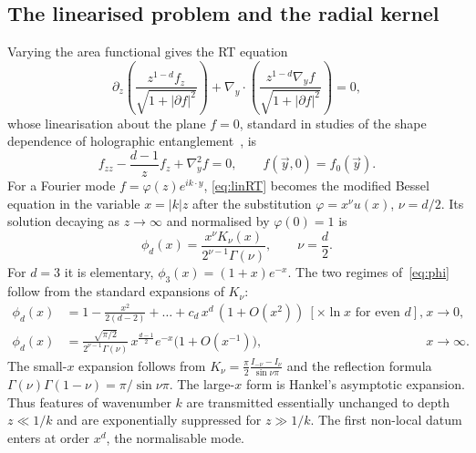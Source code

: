 \documentclass[11pt]{article}
\theoremstyle{definition}\newtheorem{definition}{Definition}[section]
\theoremstyle{remark}\newtheorem*{remark}{Remark}
\begin{document}
\subsection{The linearised problem and the radial kernel}
Varying the area functional gives the RT equation
\begin{equation}
\partial_z\!\left(\frac{z^{1-d}f_z}{\sqrt{1+|\partial f|^2}}\right)+\nabla_y\!\cdot\!\left(\frac{z^{1-d}\nabla_yf}{\sqrt{1+|\partial f|^2}}\right)=0,
\label{eq:RTeq}
\end{equation}
whose linearisation about the plane $f=0$, standard in studies of the shape dependence of holographic
entanglement~\cite{Mezei,AllaisMezei}, is
\begin{equation}
f_{zz}-\frac{d-1}{z}f_z+\nabla_y^2f=0,\qquad f(\vec y,0)=f_0(\vec y).
\label{eq:linRT}
\end{equation}
For a Fourier mode $f=\varphi(z)e^{ik\cdot y}$, \eqref{eq:linRT} becomes the modified Bessel equation in the
variable $x=|k|z$ after the substitution $\varphi=x^{\nu}u(x)$, $\nu=d/2$. Its solution decaying as
$z\to\infty$ and normalised by $\varphi(0)=1$ is
\begin{equation}
\phi_d(x)=\frac{x^{\nu}K_\nu(x)}{2^{\nu-1}\Gamma(\nu)},\qquad \nu=\frac d2 .
\label{eq:phi}
\end{equation}
For $d=3$ it is elementary, $\phi_3(x)=(1+x)e^{-x}$. The two regimes of~\eqref{eq:phi} follow from the
standard expansions of $K_\nu$:
\begin{align}
\phi_d(x)&=1-\frac{x^2}{2(d-2)}+\dots+c_d\,x^{d}\,(1+O(x^2))\ [\times\ln x \text{ for even } d],
&& x\to0,\label{eq:phismall}\\
\phi_d(x)&=\frac{\sqrt{\pi/2}}{2^{\nu-1}\Gamma(\nu)}\,x^{\frac{d-1}{2}}e^{-x}\big(1+O(x^{-1})\big),
&& x\to\infty.\label{eq:philarge}
\end{align}
The small-$x$ expansion follows from $K_\nu=\frac{\pi}{2}\frac{I_{-\nu}-I_\nu}{\sin\nu\pi}$ and the
reflection formula $\Gamma(\nu)\Gamma(1-\nu)=\pi/\sin\nu\pi$. The large-$x$ form is Hankel's asymptotic
expansion. Thus features of wavenumber $k$ are transmitted essentially unchanged to depth $z\ll1/k$ and are
exponentially suppressed for $z\gg1/k$. The first non-local datum enters at order $x^d$, the normalisable
mode.
\end{document}
